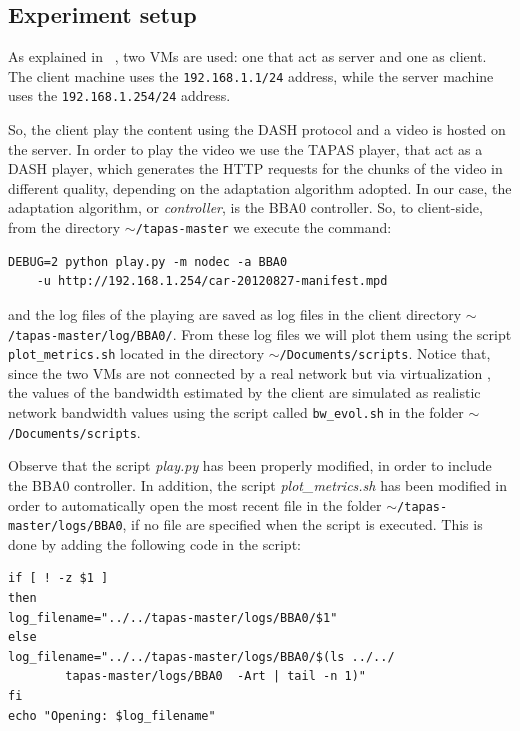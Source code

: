 \documentclass[a4paper]{report}
\begin{document}
\subsection{Experiment setup}
As explained in ~\citep{RamonAparicio}, two VMs are used: one that act as server and one as client. The client machine uses the \texttt{192.168.1.1/24} address, while the server machine uses the \texttt{192.168.1.254/24} address.

So, the client play the content using the DASH protocol and a video is hosted on the server. In order to play the video we use the TAPAS player, that act as a DASH player, which generates the HTTP requests for the chunks of the video in different quality, depending on the adaptation algorithm adopted. In our case, the adaptation algorithm, or \textit{controller}, is the BBA0 controller. So, to client-side, from the directory \texttt{$\sim$/tapas-master} we execute the command:

\begin{Verbatim}
DEBUG=2 python play.py -m nodec -a BBA0 
	-u http://192.168.1.254/car-20120827-manifest.mpd
\end{Verbatim} 

and the log files of the playing are saved as log files in the client directory \texttt{$\sim$\slash tapas-master\slash log\slash BBA0\slash}.
From these log files we will plot them using the script \texttt{plot\_metrics.sh} located in the directory \texttt{$\sim$\slash Documents\slash scripts}.
Notice that, since the two VMs are not connected by a real network but via virtualization , the values of the bandwidth estimated by the client are simulated as  realistic network bandwidth values using the script called \texttt{bw\_evol.sh} in the folder \texttt{$\sim$\slash Documents\slash scripts}.

Observe that the script \textit{play.py} has been properly modified, in order to include the BBA0 controller.
In addition, the script \textit{plot\_metrics.sh} has been modified in order to automatically open the most recent file in the folder \texttt{$\sim$\slash tapas-master\slash logs\slash BBA0}, if no file are specified when the script is executed. This is done by adding the following code in the script:

\begin{Verbatim}
if [ ! -z $1 ]
then
log_filename="../../tapas-master/logs/BBA0/$1"
else
log_filename="../../tapas-master/logs/BBA0/$(ls ../../
		tapas-master/logs/BBA0  -Art | tail -n 1)"
fi
echo "Opening: $log_filename"
\end{Verbatim}
\end{document}
